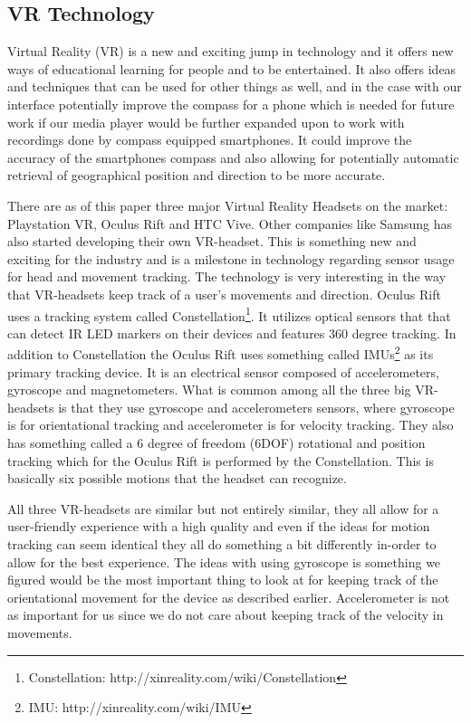 \subsection{VR Technology}
\label{vrtechnology}
Virtual Reality (VR) is a new and exciting jump in technology and it offers new ways of educational learning for people and to be entertained. It also offers ideas and techniques that can be used for other things as well, and in the case with our interface potentially improve the compass for a phone which is needed for future work if our media player would be further expanded upon to work with recordings done by compass equipped smartphones. It could improve the accuracy of the smartphones compass and also allowing for potentially automatic retrieval of geographical position and direction to be more accurate. 

There are as of this paper three major Virtual Reality Headsets on the market: Playstation VR, Oculus Rift and HTC Vive. Other companies like Samsung has also started developing their own VR-headset. This is something new and exciting for the industry and is a milestone in technology regarding sensor usage for head and movement tracking. The technology is very interesting in the way that VR-headsets keep track of a user's movements and direction. Oculus Rift uses a tracking system called Constellation\footnote{Constellation: http://xinreality.com/wiki/Constellation}. It utilizes optical sensors that that can detect IR LED markers on their devices and features 360 degree tracking. In addition to Constellation the Oculus Rift uses something called IMUs\footnote{IMU: http://xinreality.com/wiki/IMU} as its primary tracking device. It is an electrical sensor composed of accelerometers, gyroscope and magnetometers. What is common among all the three big VR-headsets is that they use gyroscope and accelerometers sensors, where gyroscope is for orientational tracking and accelerometer is for velocity tracking. They also has something called a 6 degree of freedom (6DOF) rotational and position tracking which for the Oculus Rift is performed by the Constellation. This is basically six possible motions that the headset can recognize.

All three VR-headsets are similar but not entirely similar, they all allow for a user-friendly experience with a high quality and even if the ideas for motion tracking can seem identical they all do something a bit differently in-order to allow for the best experience. The ideas with using gyroscope is something we figured would be the most important thing to look at for keeping track of the orientational movement for the device as described earlier. Accelerometer is not as important for us since we do not care about keeping track of the velocity in movements.

